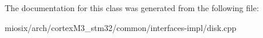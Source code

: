 The documentation for this class was generated from the following file\-:\begin{DoxyCompactItemize}
\item 
miosix/arch/cortex\-M3\-\_\-stm32/common/interfaces-\/impl/disk.\-cpp\end{DoxyCompactItemize}
